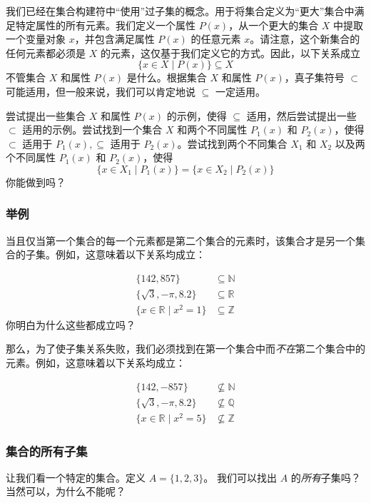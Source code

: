 我们已经在集合构建符中``使用''过子集的概念。用于将集合定义为``更大''集合中满足特定属性的所有元素。我们定义一个属性 $P(x)$，从一个更大的集合 $X$ 中提取一个变量对象 $x$，并包含满足属性 $P(x)$ 的任意元素 $x$。请注意，这个新集合的任何元素都必须是 $X$ 的元素，这仅基于我们定义它的方式。因此，以下关系成立
\[\{x \in X \mid P(x)\} \subseteq X\]
不管集合 $X$ 和属性 $P(x)$ 是什么。根据集合 $X$ 和属性 $P(x)$，真子集符号 $\subset$ 可能适用，但一般来说，我们可以肯定地说 $\subseteq$ 一定适用。

尝试提出一些集合 $X$ 和属性 $P(x)$ 的示例，使得 $\subseteq$ 适用，然后尝试提出一些 $\subset$ 适用的示例。尝试找到一个集合 $X$ 和两个不同属性 $P_1(x)$ 和 $P_2(x)$，使得 $\subset$ 适用于 $P_1(x), \subseteq$ 适用于 $P_2(x)$。尝试找到两个不同集合 $X_1$ 和 $X_2$ 以及两个不同属性 $P_1(x)$ 和 $P_2(x)$，使得
\[\{x \in X_1 \mid P_1(x)\} = \{x \in X_2 \mid P_2(x)\}\]
你能做到吗？

\subsubsection*{举例}

当且仅当第一个集合的每一个元素都是第二个集合的元素时，该集合才是另一个集合的子集。例如，这意味着以下关系均成立：

\begin{align*}
    \{142, 857\} &\subseteq \mathbb{N} \\
    \{\sqrt{3}, -\pi, 8.2\} &\subseteq \mathbb{R} \\
    \{x \in \mathbb{R} \mid x^2 = 1\} &\subseteq \mathbb{Z}
\end{align*}
你明白为什么这些都成立吗？

那么，为了使子集关系失败，我们必须找到在第一个集合中而\emph{不在}第二个集合中的元素。例如，这意味着以下关系均成立：

\begin{align*}
    \{142, -857\} &\nsubseteq \mathbb{N} \\
    \{\sqrt{3}, -\pi, 8.2\} &\nsubseteq \mathbb{Q} \\
    \{x \in \mathbb{R} \mid x^2 = 5\} &\nsubseteq \mathbb{Z}
\end{align*}

\subsubsection*{集合的所有子集}

让我们看一个特定的集合。定义 $A = \{1, 2, 3\}$。 我们可以找出 $A$ 的\emph{所有}子集吗？当然可以，为什么不能呢？

